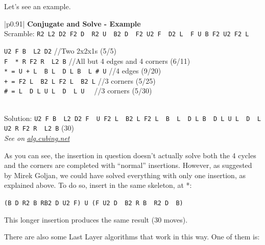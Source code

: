 \documentclass[11pt,a4paper]{book}
\newcommand{\p}{\textquotesingle}
\newcommand{\m}{\texttt}
\newcommand{\ps}{\p\,\,}
\newcommand{\comment}[1]{{\color{gray}\quad//#1}}
\begin{document}
Let's see an example.

\bigskip
\begin{tabular}{|p{}|}
\hline
\textbf{Conjugate and Solve - Example}\\
\hline
Scramble: \m{R2 L2 D2 F2 D\ps R2 U\ps B2 D\ps F2 U2 F\ps D2 L\ps F U B F2 U2 F2 L}\\
\hline
\begin{minipage}[l]{0.650\textwidth}
\m{U2 F B\ps L2 D2} \comment{Two 2x2x1s (5/5)}\\
\m{F\ps * R F2 R\ps L2 B} \comment{All but 4 edges and 4 corners (6/11)}\\
\m{* = U + L\ps B L\ps D L B\ps L \# U\p} \comment{4 edges (9/20)}\\
\m{+ = F2 L\ps B2 L F2 L\ps B2 L} \comment{3 corners (5/25)}\\
\m{\# = L\ps D L U L\ps D\ps L U\ps} \comment{3 corners (5/30)}
\end{minipage}
\begin{minipage}[c]{0.25\textwidth}

\end{minipage}\\
\hline
Solution: \m{U2 F B\ps L2 D2 F\ps U F2 L\ps B2 L F2 L\ps B\ps L\ps D L B\ps D L U L\ps D\ps L U2 R F2 R\ps L2 B} (30)\\
\hline
\emph{See on }\href{https://alg.cubing.net/?setup=R2_L2_D2_F2_D-_R2_U-_B2_D-_F2_U2_F-_D2_L-_F_U_B_F2_U2_F2_L&alg=U2_F_B-_L2_D2_\%2F\%2FTwo_2x2x1s_(5\%2F5)\%7D\%0AF-_(U_(F2_L-_B2_L_F2_L-_B2_L)_L-_B_L-_D_L_B-_L_(L-_D_L_U_L-_D-_L_U-)_U-)_R_F2_R-_L2_B_\%2F\%2FAll_but_4_edges_and_4_corners_(6\%2F11)}{\emph{alg.cubing.net}}\\
\hline
\end{tabular}
\bigskip

As you can see, the insertion in question doesn't actually solve both the 4 cycles and the corners are completed with ``normal'' insertions. However, as suggested by Mirek Goljan, we could have solved everything with only one insertion, as explained above. To do so, insert in the same skeleton, at *:

\begin{center}
\m{(B D R2 B R\p B2 D U2 F\p) U (F U2 D\ps B2 R B\ps R2 D\ps B\p)}
\end{center}

This longer insertion produces the same result (30 moves).

There are also some Last Layer algorithms that work in this way. One of them is:
\end{document}
